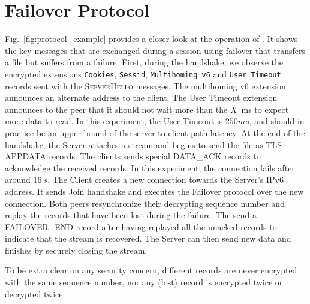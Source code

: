 \section{Failover Protocol}
\label{app:failover}
Fig.~\ref{fig:protocol_example} provides a closer look at the operation of \tcpls. It
shows the key \tcpls messages that are exchanged during a \tcpls session using failover
that transfers a file but suffers from a failure. First, during the \tcpls
handshake, we observe the \tls encrypted extensions \texttt{Cookies}, \texttt{Sessid},
\texttt{Multihoming v6} and \texttt{User Timeout} records sent with the
\textsc{ServerHello} messages. The multihoming v6 extension announces an
alternate address to the client. The User Timeout \tcpls extension
announces to the peer that it should not wait more than the $X$~ms to expect
more data to read. In this experiment, the User Timeout is $250ms$, and
should in practice be an upper bound of the server-to-client path latency.
At the end of the handshake, the Server attaches a stream and
begins to send the file as TLS APPDATA records. The clients sends
special \tcpls DATA\_ACK records to acknowledge the received records. In this
experiment, the \tcp connection fails after around $16~s$. The Client creates
a new \tcp connection towards the Server's IPv6 address. It sends Join \tcpls handshake
and executes the Failover protocol over the new connection. Both peers
resynchronize their decrypting sequence number and replay the records that have
been lost during the failure. The send a FAILOVER\_END record after having replayed all
the unacked records to indicate that the stream is recovered. The Server can then
send new data and finishes by securely closing the stream.

To be extra clear on any security concern, different records are never encrypted
with the same sequence number, nor any (lost) record is encrypted twice or decrypted
twice.

\def\Client{Client}
\def\Server{Server}
\def\Inactivity{Inactivity}
\def\Event{Event}



